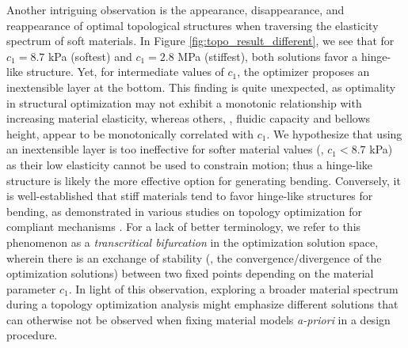 Another intriguing observation is the appearance, disappearance, and reappearance of optimal topological structures when traversing the elasticity spectrum of soft materials. In Figure \ref{fig:topo_result_different}, we see that for $c_1 = 8.7$ kPa (softest) and $c_1 = 2.8$ MPa (stiffest), both solutions favor a hinge-like structure. Yet, for intermediate values of $c_1$, the optimizer proposes an inextensible layer at the bottom. This finding is quite unexpected, as optimality in structural optimization may not exhibit a monotonic relationship with increasing material elasticity, whereas others, \eg, fluidic capacity and bellows height, appear to be monotonically correlated with $c_1$. We hypothesize that using an inextensible layer is too ineffective for softer material values (\ie, $c_1 < 8.7$ kPa) as their low elasticity cannot be used to constrain motion; thus a hinge-like structure is likely the more effective option for generating bending. Conversely, it is well-established that stiff materials tend to favor hinge-like structures for bending, as demonstrated in various studies on topology optimization for compliant mechanisms \cite{Bendsoe2003, Zhang2017Topo, Luo2016Mar}. For a lack of better terminology, we refer to this phenomenon as a \textit{transcritical bifurcation} in the optimization solution space, wherein there is an exchange of stability (\ie, the convergence/divergence of the optimization solutions) between two fixed points depending on the material parameter $c_1$. In light of this observation, exploring a broader material spectrum during a topology optimization analysis might emphasize different solutions that can otherwise not be observed when fixing material models \textit{a-priori} in a design procedure.